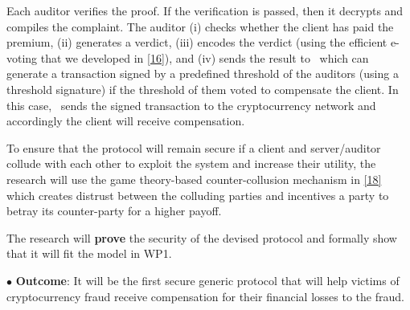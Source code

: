 Each auditor verifies the proof. If the verification is passed, then it decrypts and compiles the complaint. The auditor (i) checks whether the client has paid the premium, (ii) generates a verdict, (iii) encodes the verdict (using the efficient e-voting that we developed in \href{https://eprint.iacr.org/2022/107.pdf}{[16]}), and (iv) sends the result to \cs\ which can generate a transaction signed by a predefined threshold of the auditors (using a threshold signature) if the threshold of them voted to compensate the client. In this case, \cs\ sends the signed transaction to the cryptocurrency network and accordingly the client will receive compensation.  


To ensure that the protocol will remain secure if a client and server/auditor collude with each other to exploit the system and increase their utility, the research will use the game theory-based counter-collusion mechanism in \href{https://dl.acm.org/doi/10.1145/3133956.3134032}{[18]} which creates distrust between the colluding parties and incentives a party to betray its counter-party for a higher payoff. 

The research will \textbf{prove} the security of the devised protocol and formally show that it will fit the model in WP1.  

 
 
 \noindent$\bullet$\textbf{ Outcome}: It will be the first secure generic protocol that will help victims of cryptocurrency fraud receive compensation for their financial losses to the fraud. 
 
 
 
 
 
 
